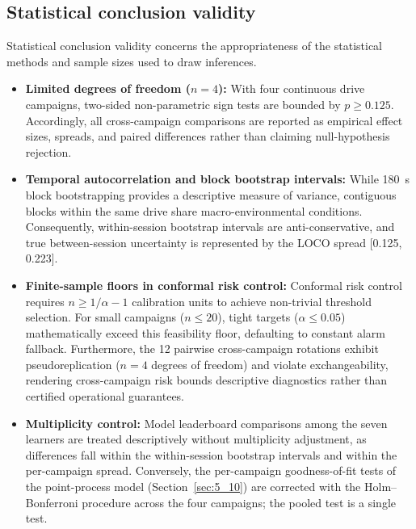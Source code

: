 \subsection{Statistical conclusion validity}
Statistical conclusion validity concerns the appropriateness of the statistical methods and sample sizes used to draw inferences.
\begin{itemize}
    \item \textbf{Limited degrees of freedom ($n=4$):} With four continuous drive campaigns, two-sided non-parametric sign tests are bounded by $p \ge 0.125$. Accordingly, all cross-campaign comparisons are reported as empirical effect sizes, spreads, and paired differences rather than claiming null-hypothesis rejection.
    \item \textbf{Temporal autocorrelation and block bootstrap intervals:} While 180~s block bootstrapping provides a descriptive measure of variance, contiguous blocks within the same drive share macro-environmental conditions. Consequently, within-session bootstrap intervals are anti-conservative, and true between-session uncertainty is represented by the LOCO spread [0.125, 0.223].
    \item \textbf{Finite-sample floors in conformal risk control:} Conformal risk control requires $n \ge 1/\alpha - 1$ calibration units to achieve non-trivial threshold selection. For small campaigns ($n \le 20$), tight targets ($\alpha \le 0.05$) mathematically exceed this feasibility floor, defaulting to constant alarm fallback. Furthermore, the 12 pairwise cross-campaign rotations exhibit pseudoreplication ($n=4$ degrees of freedom) and violate exchangeability, rendering cross-campaign risk bounds descriptive diagnostics rather than certified operational guarantees.
    \item \textbf{Multiplicity control:} Model leaderboard comparisons among the seven learners are treated descriptively without multiplicity adjustment, as differences fall within the within-session bootstrap intervals and within the per-campaign spread. Conversely, the per-campaign goodness-of-fit tests of the point-process model (Section~\ref{sec:5_10}) are corrected with the Holm--Bonferroni procedure across the four campaigns; the pooled test is a single test.
\end{itemize}

